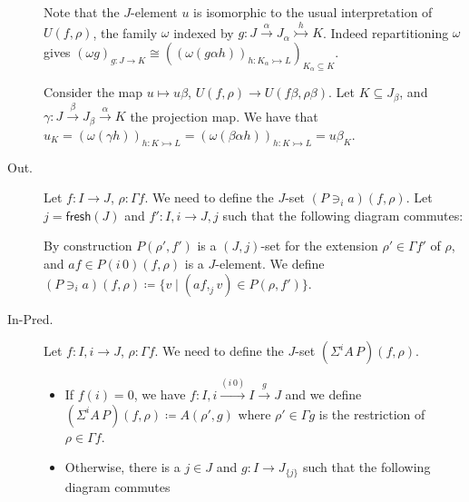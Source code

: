 \documentclass[english]{PaperTools/latex/lipics}
\newcommand\op[1]{∋_{#1}}
\newcommand\ip[3]{Σ^{#1} {#2}\,{#3}}
\def\fresh#1{\mathsf{fresh}(#1)}
\begin{document}
\begin{description}
    Note that the $J$-element $u$ is isomorphic to the usual interpretation of
    $U(f,ρ)$, the family $ω$ indexed by $g : J \stackrel{α}{→} J_α \stackrel {h}{↣} K$.
    Indeed repartitioning $ω$ gives
    $\left(ωg\right)_{g : J → K} ≅ \left(\left(ω(gαh)\right)_{h : K_α ↣ L}\right)_{K_α ⊆ K}$.

    Consider the map $u ↦ uβ$, $U(f,ρ) → U(fβ,ρβ)$.  Let
    $K ⊆ J_β$, and $γ : J \stackrel{β}{→} J_β \stackrel{α}{→} K$ the projection map.
    We have that
    $u_K = \left(ω(γh)\right)_{h : K ↣ L}
         = \left(ω(βαh)\right)_{h : K ↣ L}
         = uβ_K$.

  \item[\sc Out.]
    Let $f : I → J$, $ρ : Γf$.  We need to define the $J$-set $(P \op {i} a)(f,ρ)$.
    Let $j = \fresh J$ and $f' : I,i → J,j$ such that the following
    diagram commutes:


    By construction $P(ρ',f')$ is a $(J,j)$-set for the extension $ρ' ∈ Γf'$ of $ρ$,
    and $af ∈ P(i\,0)(f,ρ)$ is a $J$-element.
    We define $(P \op {i} a)(f,ρ) ≔ \{ v \mid (af ,_j v) ∈ P(ρ,f')\}$.

  \item[\sc In-Pred.]
    Let $f : I,i → J$, $ρ : Γf$.  We need to define the $J$-set $(\ip {i} A P)(f,ρ)$.

    \begin{itemize}
      \item If $f(i) = 0$, we have $f : I,i \stackrel{(i\,0)}{→} I \stackrel{g}{→} J$
        and we define $(\ip {i} A P)(f,ρ) ≔ A(ρ',g)$
        where $ρ' ∈ Γg$ is the restriction of $ρ ∈ Γf$.

      \item Otherwise, there is a $j ∈ J$ and $g : I → J_{\{j\}}$ such that
        the following diagram commutes

\end{itemize}
\end{description}
\end{document}

